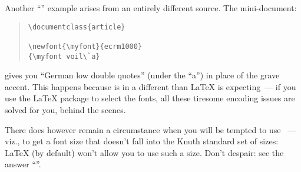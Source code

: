 Another ``'' example arises from an entirely different
source.  The mini-document:
\begin{quote}
\begin{verbatim}
\documentclass{article}

\newfont{\myfont}{ecrm1000}
{\myfont voil\`a}

\end{verbatim}
\end{quote}
gives you ``German low double quotes'' (under the ``a'') in place of
the grave accent.  This happens because  is in a
different  than \LaTeX{} is
expecting~--- if you use the \LaTeX{}  package to
select the  fonts, all these tiresome encoding issues are
solved for you, behind the scenes.

There does however remain a circumstance when you will be tempted to
use ~--- viz., to get a font size that doesn't fall into
the Knuth standard set of sizes: \LaTeX{} (by default) won't allow you
to use such a size.  Don't despair: see the answer %
``''.


